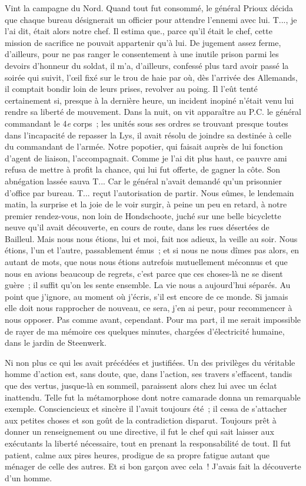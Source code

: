 \documentclass[french,twoside]{book} %
\begin{document}
Vint la campagne du Nord. Quand tout fut consommé, le général Prioux décida que chaque bureau désignerait un officier pour attendre l’ennemi avec lui. T..., je l’ai dit, était alors notre chef. Il estima que., parce qu’il était le chef, cette mission de sacrifice ne pouvait appartenir qu’à lui. De jugement assez ferme, d’ailleurs, pour ne pas ranger le consentement à une inutile prison parmi les devoirs d’honneur du soldat, il m’a, d’ailleurs, confessé plus tard avoir passé la soirée qui suivit, l’œil fixé sur le trou de haie par où, dès l’arrivée des Allemands, il comptait bondir loin de leurs prises, revolver au poing. Il l’eût tenté certainement si, presque à la dernière heure, un incident inopiné n’était venu lui rendre sa liberté de mouvement. Dans la nuit, on vit apparaître au P.C. le général commandant le 4\emph{e} corps ; les unités sous ses ordres se trouvant presque toutes dans l’incapacité de repasser la Lys, il avait résolu de joindre sa destinée à celle du commandant de l’armée. Notre popotier, qui faisait auprès de lui fonction d’agent de liaison,   l’accompagnait. Comme je l’ai dit plus haut, ce pauvre ami refusa de mettre à profit la chance, qui lui fut offerte, de gagner la côte. Son abnégation lassée sauva T... Car le général n’avait demandé qu’un prisonnier d’office par bureau. T... reçut l’autorisation de partir. Nous eûmes, le lendemain matin, la surprise et la joie de le voir surgir, à peine un peu en retard, à notre premier rendez-vous, non loin de Hondschoote, juché sur une belle bicyclette neuve qu’il avait découverte, en cours de route, dans les rues désertées de Bailleul. Mais nous nous étions, lui et moi, fait nos adieux, la veille au soir. Nous étions, l’un et l’autre, passablement émus ; et si nous ne nous dîmes pas alors, en autant de mots, que nous nous étions autrefois mutuellement méconnus et que nous en avions beaucoup de regrets, c’est parce que ces choses-là ne se disent guère ; il suffit qu’on les sente ensemble. La vie nous a aujourd’hui séparés. Au point que j’ignore, au moment où j’écris, s’il est encore de ce monde. Si jamais elle doit nous rapprocher de nouveau, ce sera, j’en ai peur, pour recommencer à nous opposer. Pas comme avant, cependant. Pour ma part, il me serait impossible de rayer de ma mémoire ces quelques minutes, chargées d’électricité humaine, dans le jardin de Steenwerk.\par
Ni non plus ce qui les avait précédées et justifiées. Un des privilèges du véritable homme d’action est, sans doute, que, dans l’action, ses travers s’effacent, tandis que des vertus, jusque-là en sommeil, paraissent alors chez lui avec un éclat inattendu. Telle fut la métamorphose dont notre camarade donna un remarquable exemple. Consciencieux et sincère il l’avait toujours été ; il cessa de s’attacher aux petites choses et son goût de la contradiction disparut. Toujours prêt à donner un renseignement ou une directive, il fut le chef qui sait laisser aux exécutants la liberté nécessaire, tout en prenant la responsabilité de tout. Il fut patient, calme aux pires heures, prodigue de sa propre fatigue autant que   ménager de celle des autres. Et si bon garçon avec cela ! J’avais fait la découverte d’un homme.\par
\end{document}
